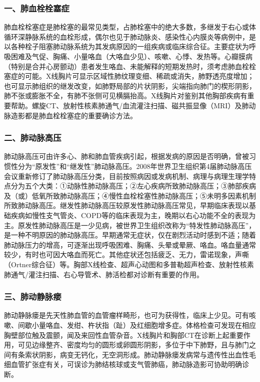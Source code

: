 \subsubsection{一、肺血栓栓塞症}

肺血栓栓塞症是肺栓塞的最常见类型，占肺栓塞中的绝大多数，多继发于右心或体循环深静脉系统的血栓形成，偶尔也见于肺动脉炎、感染性心内膜炎等病例中，是以各种栓子阻塞肺动脉系统为其发病原因的一组疾病或临床综合征。主要症状为呼吸困难及气促、胸痛、小量咯血（大咯血少见）、咳嗽、心悸、发热等。心瓣膜病（特别是合并心房颤动）患者发生咯血、未能解释的短期发热时，须考虑肺血栓栓塞症的可能。X线胸片可显示区域性肺纹理变细、稀疏或消失，肺野透亮度增加；也可显示肺组织的继发改变，如肺野局部的片状阴影，尖端指向肺门的楔形阴影，肺不张或膨胀不全，有肺不张侧可见横膈抬高。X线胸片对鉴别其他胸部疾病有重要帮助。螺旋CT、放射性核素肺通气/血流灌注扫描、磁共振显像（MRI）及肺动脉造影都是肺血栓栓塞症的重要确诊方法。

\subsubsection{二、肺动脉高压}

肺动脉高压可由许多心、肺和肺血管疾病引起，根据发病的原因是否明确，曾被习惯性分为“原发性”和“继发性”肺动脉高压。2008年世界卫生组织第4届肺动脉高压会议重新修订了肺动脉高压分类，目前按照病因或发病机制、病理与病理生理学特点分为五个大类：①动脉性肺动脉高压；②左心疾病所致肺动脉高压；③肺部疾病及（或）低氧所致肺动脉高压；④慢性血栓栓塞性肺动脉高压；⑤未明多因素机制所致肺动脉高压。继发性肺动脉高压较原发性肺动脉高压常见，早期临床表现以基础疾病如慢性支气管炎、COPD等的临床表现为主，晚期以右心功能不全的表现为主。原发性肺动脉高压是一少见病，被世界卫生组织改称为“特发性肺动脉高压”，是一种不明原因的肺动脉高压。早期通常无症状，仅在剧烈活动时感到不适；随着肺动脉压力的增高，可逐渐出现呼吸困难、胸痛、头晕或晕厥、咯血。咯血量通常较少，有时也可因大咯血而死亡。其他症状还包括疲乏、无力，雷诺现象，声嘶（Ortner综合征）等。胸部X线检查、超声心动图和多普勒超声检查、放射性核素肺通气/灌注扫描、右心导管术、肺活检都对诊断有重要的作用。

\subsubsection{三、肺动静脉瘘}

肺动静脉瘘是先天性肺血管的血管瘤样畸形，也可为获得性，临床上少见。可有咳嗽、间歇小量咯血、发绀、杵状指（趾）及红细胞增多症。体格检查可发现在相应胸壁部位触及震颤，闻及来回性血管杂音。X线胸片和胸部CT在诊断上起重要作用，可见边缘整齐、密度均匀的圆形或卵圆形阴影，多位于中下肺野，且与肺门之间有条索状阴影，病变无钙化，无空洞形成。肺动静脉瘘发病常与遗传性出血性毛细血管扩张症有关，可误诊为肺结核球或支气管肺癌，肺动脉造影可协助明确诊断。

